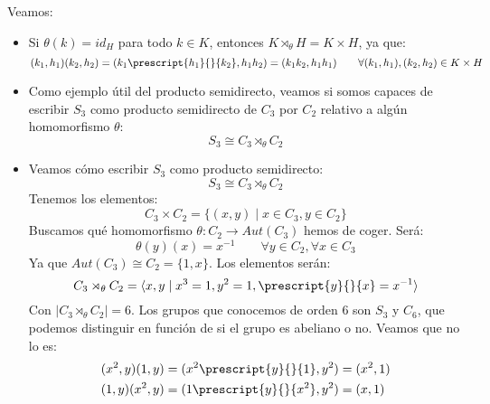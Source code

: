 \begin{ejemplo}
    Veamos:
    \begin{itemize}
        \item Si $\theta(k) = id_H$ para todo $k\in K$, entonces $K\rtimes_\theta H = K\times H$, ya que:
            \begin{equation*}
                (k_1,h_1)(k_2,h_2) = (k_1 \prescript{h_1}{}{k_2}, h_1h_2) = (k_1k_2, h_1h_1) \qquad \forall (k_1,h_1), (k_2,h_2) \in K\times H
            \end{equation*}
        \item Como ejemplo útil del producto semidirecto, veamos si somos capaces de escribir $S_3$ como producto semidirecto de $C_3$ por $C_2$ relativo a algún homomorfismo $\theta$:
            \begin{equation*}
                S_3\cong C_3\rtimes_{\theta} C_2
            \end{equation*}
        \item Veamos cómo escribir $S_3$ como producto semidirecto:
            \begin{equation*}
                S_3 \cong C_3 \rtimes_{\theta} C_2
            \end{equation*}
            Tenemos los elementos:
            \begin{equation*}
                C_3\times C_2 = \{(x,y) \mid x\in C_3, y\in C_2\}
            \end{equation*}
            Buscamos qué homomorfismo $\theta:C_2\to Aut(C_3)$ hemos de coger. Será:
            \begin{equation*}
                \theta(y)(x) = x^{-1} \qquad \forall y\in C_2, \forall x\in C_3
            \end{equation*}
            Ya que $Aut(C_3)\cong C_2 = \{1,x\}$. Los elementos serán:
            \begin{equation*}
                C_3 \rtimes_\theta C_2 = \langle x,y\mid x^3=1, y^2 = 1, \prescript{y}{}{x}= x^{-1}\rangle 
            \end{equation*}
            Con $|C_3\rtimes_\theta C_2| = 6$. Los grupos que conocemos de orden 6 son $S_3$ y $C_6$, que podemos distinguir en función de si el grupo es abeliano o no. Veamos que no lo es:
            \begin{align*}
                (x^2,y)(1,y) &= (x^2 \prescript{y}{}{1}, y^2) = (x^2,1) \\
                (1,y)(x^2,y) &= (1\prescript{y}{}{x^2}, y^2) = (x, 1)
            \end{align*}

\end{itemize}
\end{ejemplo}
